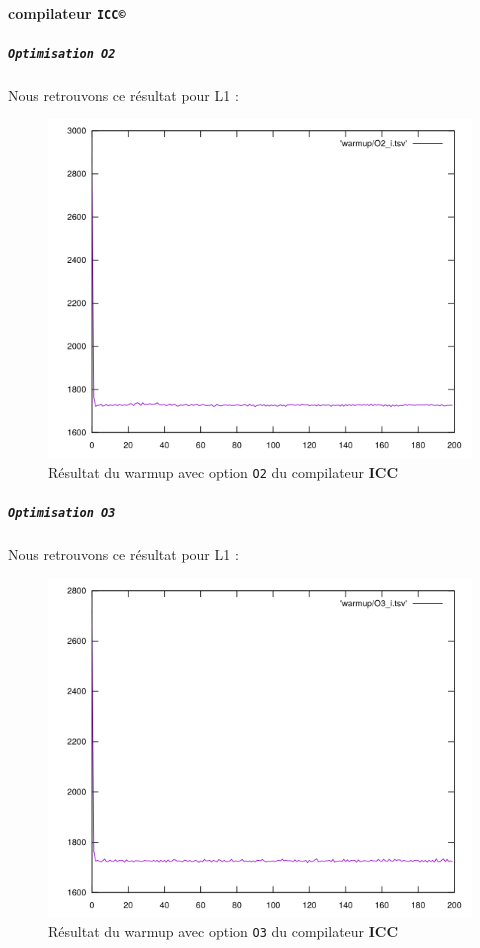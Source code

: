 \documentclass{report}
\begin{document}
\paragraph{compilateur \texttt{ICC©}}
    \subparagraph{ \texttt{Optimisation O2}}
  Nous retrouvons ce résultat pour L1 :
  \begin{figure}[ht!]
    \centering
\includegraphics[scale=0.45]{resources/L1/warmup/O2_i.png}
    \caption{Résultat du warmup avec option \texttt{O2} du compilateur \textbf{ICC}}
  \end{figure}
  \newpage
\subparagraph{ \texttt{Optimisation O3}}
Nous retrouvons ce résultat pour L1 :
\begin{figure}[ht!]
  \centering
  \includegraphics[scale=0.45]{resources/L1/warmup/O3_i.png}
  \caption{Résultat du warmup avec option \texttt{O3} du compilateur \textbf{ICC}}
\end{figure}
\end{document}
